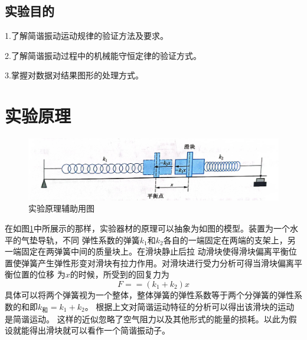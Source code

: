\documentclass{ctexart}
\begin{document}
  \subsection{实验目的}
  1.\quad 了解简谐振动运动规律的验证方法及要求。

  2.\quad 了解简谐振动过程中的机械能守恒定律的验证方式。
  
  3.\quad 掌握对数据对结果图形的处理方式。

\section{实验原理}
  \begin{figure}[b]
    \centering
    \includegraphics[height=0.3\textwidth,width=1\textwidth]{yuanli1.jpg}
    \caption{实验原理辅助用图}\label{figureyuanli1}
  \end{figure}
在如图\ref{figureyuanli1}中所展示的那样，实验器材的原理可以抽象为如图的模型。装置为一个水平的气垫导轨，不同
弹性系数的弹簧$k_{1}$和$k_{2}$各自的一端固定在两端的支架上，另一端固定在两弹簧中间的质量块上。在滑块静止后拉
动滑块使得滑块偏离平衡位置使弹簧产生弹性形变对滑块有拉力作用。对滑块进行受力分析可得当滑块偏离平衡位置的位移
为$x$的时候，所受到的回复力为
\begin{equation}
  F==(k_{1}+k_{2})x
\end{equation}
具体可以将两个弹簧视为一个整体，整体弹簧的弹性系数等于两个分弹簧的弹性系数的和即$k_{和}=k_{1}+k_{2}$。
根据上文对简谐运动特征的分析可以得出该滑块的运动是简谐运动。
这样的近似忽略了空气阻力以及其他形式的能量的损耗。以此为假设就能得出滑块就可以看作一个简谐振动子。
\end{document}
